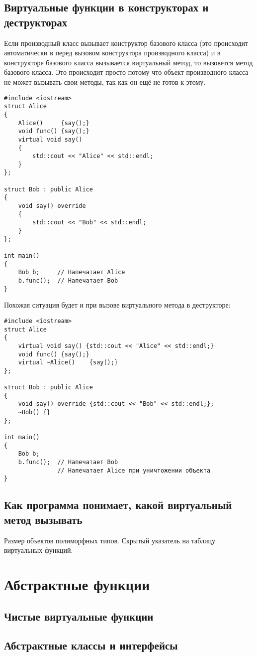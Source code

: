 \documentclass{article}
\begin{document}
\subsection*{Виртуальные функции в конструкторах и деструкторах}
Если производный класс вызывает конструктор базового класса (это происходит автоматически в перед вызовом конструктора производного класса) и в конструкторе базового класса вызывается виртуальный метод, то вызовется метод базового класса.
Это происходит просто потому что объект производного класса не может вызывать свои методы, так как он ещё не готов к этому. 
\begin{lstlisting}
#include <iostream>
struct Alice 
{
    Alice()     {say();}
    void func() {say();}
    virtual void say() 
    {
    	std::cout << "Alice" << std::endl;
    }
};

struct Bob : public Alice 
{
    void say() override 
    {
    	std::cout << "Bob" << std::endl;
    }
};

int main() 
{
    Bob b;     // Напечатает Alice
    b.func();  // Напечатает Bob
}
\end{lstlisting}
Похожая ситуация будет и при вызове виртуального метода в деструкторе:
\begin{lstlisting}
#include <iostream>
struct Alice 
{
    virtual void say() {std::cout << "Alice" << std::endl;}
    void func() {say();}
    virtual ~Alice()    {say();}
};

struct Bob : public Alice 
{
    void say() override {std::cout << "Bob" << std::endl;};
    ~Bob() {}
};

int main() 
{
    Bob b;
    b.func();  // Напечатает Bob
               // Напечатает Alice при уничтожении объекта
}
\end{lstlisting}

\subsection*{Как программа понимает, какой виртуальный метод вызывать}
Размер объектов полиморфных типов. Скрытый указатель на таблицу виртуальных функций.


\section*{Абстрактные функции}
\subsection*{Чистые виртуальные функции}
\subsection*{Абстрактные классы и интерфейсы}
\end{document}
